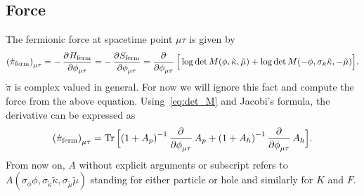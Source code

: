 \documentclass[a4paper, fleqn, twoside, notitlepage]{scrartcl}
\begin{document}
\subsection{Force}

The fermionic force at spacetime point $\mu\tau$ is given by
\begin{align}
  {(\dot{\pi}_{\text{ferm}})}_{\mu\tau} = -\dpd{H_{\text{ferm}}}{\phi_{\mu\tau}} = -\dpd{S_\text{ferm}}{\phi_{\mu\tau}} =  \dpd{}{\phi_{\mu\tau}} \Big[\log \det M(\phi, \tilde{\kappa}, \tilde{\mu}) + \log \det M(-\phi, \sigma_{\tilde{\kappa}}\tilde{\kappa}, -\tilde{\mu})\Big].
\end{align}
$\dot{\pi}$ is complex valued in general. For now we will ignore this fact and compute the force from the above equation.
Using~\eqref{eq:det_M} and Jacobi's formula, the derivative can be expressed as
\begin{align}
  {(\dot{\pi}_{\text{ferm}})}_{\mu\tau} = \Tr \Big[{(1+A_p)}^{-1}\dpd{}{\phi_{\mu\tau}}A_p + {(1+A_h)}^{-1}\dpd{}{\phi_{\mu\tau}}A_h\Big].
\end{align}
From now on, $A$ without explicit arguments or subscript refers to $A(\sigma_\phi\phi, \sigma_{\tilde{\kappa}}\tilde{\kappa}, \sigma_{\tilde{\mu}}\tilde{\mu})$ standing for either particle or hole and similarly for $K$ and $F$.\\
\end{document}
